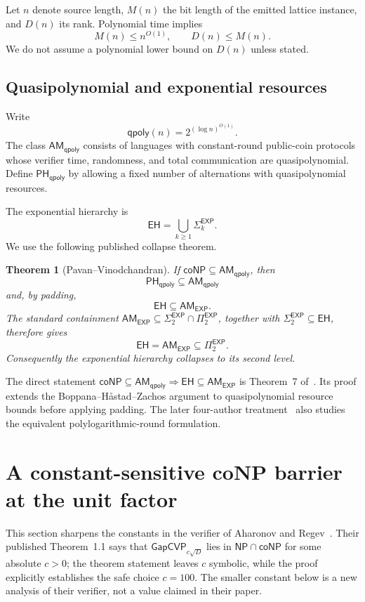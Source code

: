 \documentclass[11pt]{article}
\newtheorem{theorem}{Theorem}[section]
\newcommand{\GapCVP}{\mathsf{GapCVP}}
\newcommand{\AM}{\mathsf{AM}}
\newcommand{\qpoly}{\mathsf{qpoly}}
\newcommand{\EXP}{\mathsf{EXP}}
\newcommand{\EH}{\mathsf{EH}}
\newcommand{\PH}{\mathsf{PH}}
\begin{document}
Let $n$ denote source length, $M(n)$ the bit length of the emitted lattice
instance, and $D(n)$ its rank.  Polynomial time implies
\[
  M(n)\le n^{O(1)},\qquad D(n)\le M(n).                 \tag{3}
\]
We do not assume a polynomial lower bound on $D(n)$ unless stated.

\subsection{Quasipolynomial and exponential resources}

Write
\[
  \qpoly(n)=2^{(\log n)^{O(1)}}.
\]
The class $\AM_{\qpoly}$ consists of languages with constant-round public-coin
protocols whose verifier time, randomness, and total communication are
quasipolynomial.  Define $\PH_{\qpoly}$ by allowing a fixed number of
alternations with quasipolynomial resources.

The exponential hierarchy is
\[
  \EH=\bigcup_{k\ge1}\Sigma_k^{\EXP}.
\]
We use the following published collapse theorem.

\begin{theorem}[Pavan--Vinodchandran]                              \label{thm:pssv}
If $\mathsf{coNP}\subseteq\AM_{\qpoly}$, then
\[
  \PH_{\qpoly}\subseteq\AM_{\qpoly}
\]
and, by padding,
\[
  \EH\subseteq\AM_{\EXP}.
\]
The standard containment
$\AM_{\EXP}\subseteq\Sigma_2^{\EXP}\cap\Pi_2^{\EXP}$, together with
$\Sigma_2^{\EXP}\subseteq\EH$, therefore gives
\[
  \EH=\AM_{\EXP}\subseteq\Pi_2^{\EXP}.
\]
Consequently the exponential hierarchy collapses to its second level.
\end{theorem}

The direct statement $\mathsf{coNP}\subseteq\AM_{\qpoly}\Rightarrow
\EH\subseteq\AM_{\EXP}$ is Theorem~7 of~\cite{PV04}.  Its proof extends the
Boppana--H\aa stad--Zachos argument to quasipolynomial resource bounds before
applying padding.  The later four-author treatment~\cite{PSSV07} also studies
the equivalent polylogarithmic-round formulation.

\section{A constant-sensitive coNP barrier at the unit factor}
\label{sec:constant}

This section sharpens the constants in the verifier of Aharonov and
Regev~\cite{AR05}.  Their published Theorem~1.1 says that
$\GapCVP_{c\sqrt D}$ lies in $\mathsf{NP}\cap\mathsf{coNP}$ for some absolute
$c>0$; the theorem statement leaves $c$ symbolic, while the proof explicitly
establishes the safe choice $c=100$.  The smaller constant below is a new
analysis of their verifier, not a value claimed in their paper.
\end{document}

